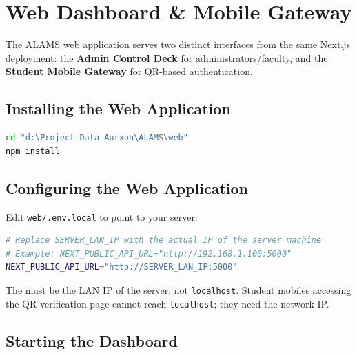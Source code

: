 \chapter{Web Dashboard \& Mobile Gateway}
\label{ch:dashboard}

The ALAMS web application serves two distinct interfaces from the same Next.js deployment: the \textbf{Admin Control Deck} for administrators/faculty, and the \textbf{Student Mobile Gateway} for QR-based authentication.

\section{Installing the Web Application}

\begin{tcolorbox}[codebox, title={Install Web App Dependencies}]
\begin{lstlisting}[language=bash]
cd "d:\Project Data Aurxon\ALAMS\web"
npm install
\end{lstlisting}
\end{tcolorbox}

\section{Configuring the Web Application}

Edit \texttt{web/.env.local} to point to your server:

\begin{tcolorbox}[codebox, title={web/.env.local}]
\begin{lstlisting}[language=bash]
# Replace SERVER_LAN_IP with the actual IP of the server machine
# Example: NEXT_PUBLIC_API_URL="http://192.168.1.100:5000"
NEXT_PUBLIC_API_URL="http://SERVER_LAN_IP:5000"
\end{lstlisting}
\end{tcolorbox}

\begin{tcolorbox}[warningbox, title={\faExclamationTriangle\quad Critical}]
The  must be the LAN IP of the server, not \texttt{localhost}. Student mobiles accessing the QR verification page cannot reach \texttt{localhost}; they need the network IP.
\end{tcolorbox}

\section{Starting the Dashboard}

